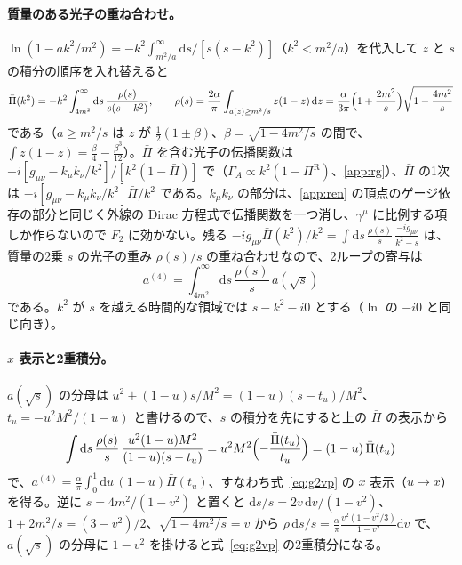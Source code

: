 \documentclass[a4paper,10pt]{ltjsarticle}
\newcommand{\dd}{\mathrm{d}}
\begin{document}
\paragraph{質量のある光子の重ね合わせ。}$\ln(1-ak^2/m^2)=-k^2\int_{m^2/a}^\infty\dd s/[s(s-k^2)]$（$k^2<m^2/a$）を代入して $z$ と $s$ の積分の順序を入れ替えると
\begin{equation*}
\bar\Pi(k^2)=-k^2\int_{4m^2}^\infty\dd s\,\frac{\rho(s)}{s(s-k^2)},\qquad
\rho(s)=\frac{2\alpha}{\pi}\int_{a(z)\ge m^2/s}z(1-z)\,\dd z=\frac{\alpha}{3\pi}\Bigl(1+\frac{2m^2}{s}\Bigr)\sqrt{1-\frac{4m^2}{s}}
\end{equation*}
である（$a\ge m^2/s$ は $z$ が $\frac12(1\pm\beta)$、$\beta=\sqrt{1-4m^2/s}$ の間で、$\int z(1-z)=\frac\beta4-\frac{\beta^3}{12}$）。$\bar\Pi$ を含む光子の伝播関数は $-i[g_{\mu\nu}-k_\mu k_\nu/k^2]/[k^2(1-\bar\Pi)]$ で（$\Gamma_A\propto k^2(1-\Pi^{\mathrm R})$、\ref{app:rg}）、$\bar\Pi$ の1次は $-i[g_{\mu\nu}-k_\mu k_\nu/k^2]\bar\Pi/k^2$ である。$k_\mu k_\nu$ の部分は、\ref{app:ren} の頂点のゲージ依存の部分と同じく外線の Dirac 方程式で伝播関数を一つ消し、$\gamma^\mu$ に比例する項しか作らないので $F_2$ に効かない。残る $-ig_{\mu\nu}\bar\Pi(k^2)/k^2=\int\dd s\,\frac{\rho(s)}{s}\,\frac{-ig_{\mu\nu}}{k^2-s}$ は、質量の2乗 $s$ の光子の重み $\rho(s)/s$ の重ね合わせなので、2ループの寄与は
\begin{equation*}
a^{(4)}=\int_{4m^2}^\infty\dd s\,\frac{\rho(s)}{s}\,a(\sqrt s)
\end{equation*}
である。$k^2$ が $s$ を越える時間的な領域では $s-k^2-i0$ とする（$\ln$ の $-i0$ と同じ向き）。

\paragraph{$x$ 表示と2重積分。}$a(\sqrt s)$ の分母は $u^2+(1-u)s/M^2=(1-u)(s-t_u)/M^2$、$t_u=-u^2M^2/(1-u)$ と書けるので、$s$ の積分を先にすると上の $\bar\Pi$ の表示から
\begin{equation*}
\int\dd s\,\frac{\rho(s)}{s}\,\frac{u^2(1-u)M^2}{(1-u)(s-t_u)}=u^2M^2\Bigl(-\frac{\bar\Pi(t_u)}{t_u}\Bigr)=(1-u)\,\bar\Pi(t_u)
\end{equation*}
で、$a^{(4)}=\frac\alpha\pi\int_0^1\dd u\,(1-u)\bar\Pi(t_u)$、すなわち式~\eqref{eq:g2vp} の $x$ 表示（$u\to x$）を得る。逆に $s=4m^2/(1-v^2)$ と置くと $\dd s/s=2v\,\dd v/(1-v^2)$、$1+2m^2/s=(3-v^2)/2$、$\sqrt{1-4m^2/s}=v$ から $\rho\,\dd s/s=\frac\alpha\pi\frac{v^2(1-v^2/3)}{1-v^2}\dd v$ で、$a(\sqrt s)$ の分母に $1-v^2$ を掛けると式~\eqref{eq:g2vp} の2重積分になる。
\end{document}
